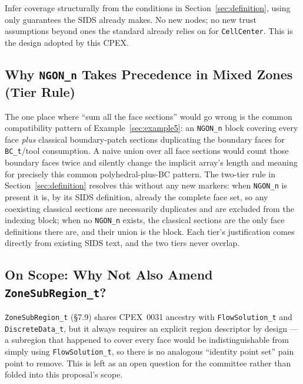 \documentclass[11pt,letterpaper]{article}
\begin{document}
Infer coverage structurally from the conditions in
Section~\ref{sec:definition}, using only guarantees the SIDS already
makes. No new nodes; no new trust assumptions beyond ones the standard
already relies on for \texttt{CellCenter}. This is the design adopted by
this CPEX.

\subsection{Why \texttt{NGON\_n} Takes Precedence in Mixed Zones (Tier Rule)}
\label{sec:tier-rationale}

The one place where ``sum all the face sections'' would go wrong is the
common compatibility pattern of Example~\ref{sec:example5}: an
\texttt{NGON\_n} block covering every face \emph{plus} classical
boundary-patch sections duplicating the boundary faces for
\texttt{BC\_t}/tool consumption. A naive union over all face sections
would count those boundary faces twice and silently change the implicit
array's length and meaning for precisely this common polyhedral-plus-BC
pattern. The two-tier rule in
Section~\ref{sec:definition} resolves this without any new markers:
when \texttt{NGON\_n} is present it is, by its SIDS definition, already
the complete face set, so any coexisting classical sections are
necessarily duplicates and are excluded from the indexing block; when no
\texttt{NGON\_n} exists, the classical sections are the only face
definitions there are, and their union is the block. Each tier's
justification comes directly from existing SIDS text, and the two tiers
never overlap.

\subsection{On Scope: Why Not Also Amend \texttt{ZoneSubRegion\_t}?}
\label{sec:zonesubregion-scope}

\texttt{ZoneSubRegion\_t} (\S7.9) shares CPEX~0031 ancestry with
\texttt{FlowSolution\_t} and \texttt{DiscreteData\_t}, but it always
requires an explicit region descriptor by design --- a subregion that
happened to cover every face would be indistinguishable from simply
using \texttt{FlowSolution\_t}, so there is no analogous ``identity point
set'' pain point to remove. This is left as an open question for the
committee rather than folded into this proposal's scope.

%
\end{document}
